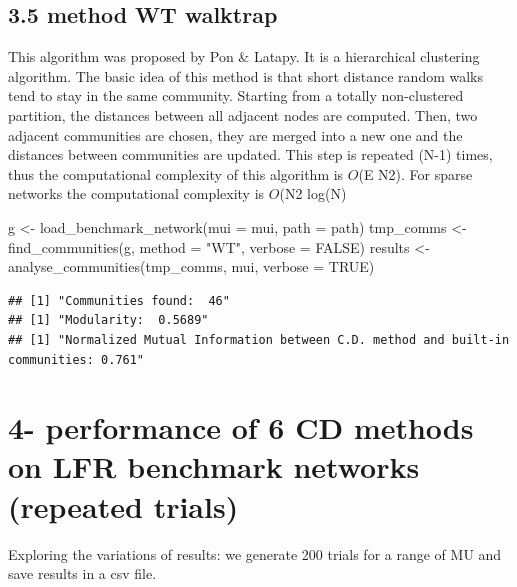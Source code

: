 \documentclass[
]{article}
\newenvironment{Shaded}{\begin{snugshade}}{\end{snugshade}}
\newcommand{\AttributeTok}[1]{\textcolor[rgb]{0.77,0.63,0.00}{#1}}
\newcommand{\ConstantTok}[1]{\textcolor[rgb]{0.00,0.00,0.00}{#1}}
\newcommand{\FunctionTok}[1]{\textcolor[rgb]{0.00,0.00,0.00}{#1}}
\newcommand{\NormalTok}[1]{#1}
\newcommand{\OtherTok}[1]{\textcolor[rgb]{0.56,0.35,0.01}{#1}}
\newcommand{\StringTok}[1]{\textcolor[rgb]{0.31,0.60,0.02}{#1}}
\begin{document}
\hypertarget{method-wt-walktrap}{%
\subsection{3.5 method WT walktrap}\label{method-wt-walktrap}}

This algorithm was proposed by Pon \& Latapy. It is a hierarchical
clustering algorithm. The basic idea of this method is that short
distance random walks tend to stay in the same community. Starting from
a totally non-clustered partition, the distances between all adjacent
nodes are computed. Then, two adjacent communities are chosen, they are
merged into a new one and the distances between communities are updated.
This step is repeated (N-1) times, thus the computational complexity of
this algorithm is \(O\)(E N2). For sparse networks the computational
complexity is \(O\)(N2 log(N)

\begin{Shaded}
\begin{Highlighting}[]
\NormalTok{g }\OtherTok{\textless{}{-}} \FunctionTok{load\_benchmark\_network}\NormalTok{(}\AttributeTok{mui =}\NormalTok{ mui, }\AttributeTok{path =}\NormalTok{ path)}
\NormalTok{tmp\_comms }\OtherTok{\textless{}{-}} \FunctionTok{find\_communities}\NormalTok{(g, }\AttributeTok{method =} \StringTok{"WT"}\NormalTok{, }\AttributeTok{verbose =} \ConstantTok{FALSE}\NormalTok{)}
\NormalTok{results }\OtherTok{\textless{}{-}} \FunctionTok{analyse\_communities}\NormalTok{(tmp\_comms, mui, }\AttributeTok{verbose =} \ConstantTok{TRUE}\NormalTok{)}
\end{Highlighting}
\end{Shaded}

\begin{verbatim}
## [1] "Communities found:  46"
## [1] "Modularity:  0.5689"
## [1] "Normalized Mutual Information between C.D. method and built-in communities: 0.761"
\end{verbatim}

\newpage

\hypertarget{performance-of-6-cd-methods-on-lfr-benchmark-networks-repeated-trials}{%
\section{4- performance of 6 CD methods on LFR benchmark networks
(repeated
trials)}\label{performance-of-6-cd-methods-on-lfr-benchmark-networks-repeated-trials}}

Exploring the variations of results: we generate 200 trials for a range
of MU and save results in a csv file.
\end{document}
